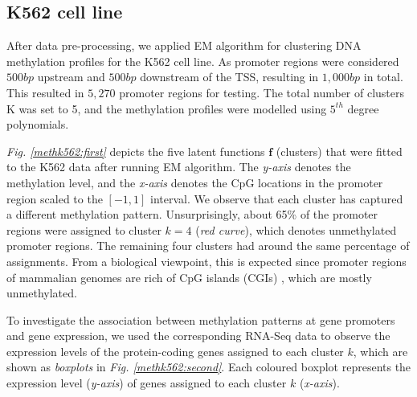 \subsection{K562 cell line} \label{meth-encode-k562-subsect}
After data pre-processing, we applied EM algorithm for clustering DNA methylation profiles for the K562 cell line. As promoter regions were considered $500bp$ upstream and $500bp$ downstream of the TSS, resulting in $1,000bp$ in total. This resulted in $5,270$ promoter regions for testing. The total number of clusters K was set to 5, and the methylation profiles were modelled using $5^{th}$ degree polynomials. 

\emph{Fig. \ref{methk562:first}} depicts the five latent functions $\mathbf{f}$ (\ie clusters) that were fitted to the K562 data after running EM algorithm. The \emph{y-axis} denotes the methylation level, and the \emph{x-axis} denotes the CpG locations in the promoter region scaled to the $[-1, 1]$ interval. We observe that each cluster has captured a different methylation pattern. Unsurprisingly, about 65\% of the promoter regions were assigned to cluster $k=4$ (\emph{red curve}), which denotes unmethylated promoter regions. The remaining four clusters had around the same percentage of assignments. From a biological viewpoint, this is expected since promoter regions of mammalian genomes are rich of CpG islands (CGIs) \citep{Illingworth2009}, which are mostly unmethylated. 

To investigate the association between methylation patterns at gene promoters and gene expression, we used the corresponding RNA-Seq data to observe the expression levels of the protein-coding genes assigned to each cluster $k$, which are shown as \emph{boxplots} in \emph{Fig. \ref{methk562:second}}. Each coloured boxplot represents the expression level (\emph{y-axis}) of genes assigned to each cluster $k$ (\emph{x-axis}). 

